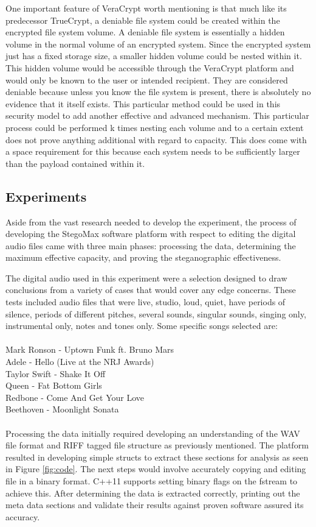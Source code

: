\documentclass[letterpaper]{article}
\begin{document}
\begin{itemize}
One important feature of VeraCrypt worth mentioning is that much like its predecessor TrueCrypt, a deniable file system could be created within the encrypted file system volume. \cite{czeskis2008defeating} A deniable file system is essentially a hidden volume in the normal volume of an encrypted system. Since the encrypted system just has a fixed storage size, a smaller hidden volume could be nested within it. This hidden volume would be accessible through the VeraCrypt platform and would only be known to the user or intended recipient. They are considered deniable because unless you know the file system is present, there is absolutely no evidence that it itself exists. This particular method could be used in this security model to add another effective and advanced mechanism. This particular process could be performed k times nesting each volume and to a certain extent does not prove anything additional with regard to capacity. This does come with a space requirement for this because each system needs to be sufficiently larger than the payload contained within it. 

\end{itemize}

\subsection{Experiments}
Aside from the vast research needed to develop the experiment, the process of developing the StegoMax software platform with respect to editing the digital audio files came with three main phases: processing the data, determining the maximum effective capacity, and proving the steganographic effectiveness. 

The digital audio used in this experiment were a selection designed to draw conclusions from a variety of cases that would cover any edge concerns. These tests included audio files that were live, studio, loud, quiet, have periods of silence, periods of different pitches, several sounds, singular sounds, singing only, instrumental only, notes and tones only. Some specific songs selected are:\\
\\
Mark Ronson - Uptown Funk ft. Bruno Mars\\
Adele - Hello (Live at the NRJ Awards)\\
Taylor Swift - Shake It Off\\
Queen - Fat Bottom Girls\\
Redbone - Come And Get Your Love\\
Beethoven - Moonlight Sonata\\
\\
Processing the data initially required developing an understanding of the WAV file format and RIFF tagged file structure as previously mentioned. The platform resulted in developing simple structs to extract these sections for analysis as seen in Figure \ref{fig:code}. The next steps would involve accurately copying and editing file in a binary format. C++11 supports setting binary flags on the fstream to achieve this. After determining the data is extracted correctly, printing out the meta data sections and validate their results against proven software assured its accuracy. 
\end{document}
